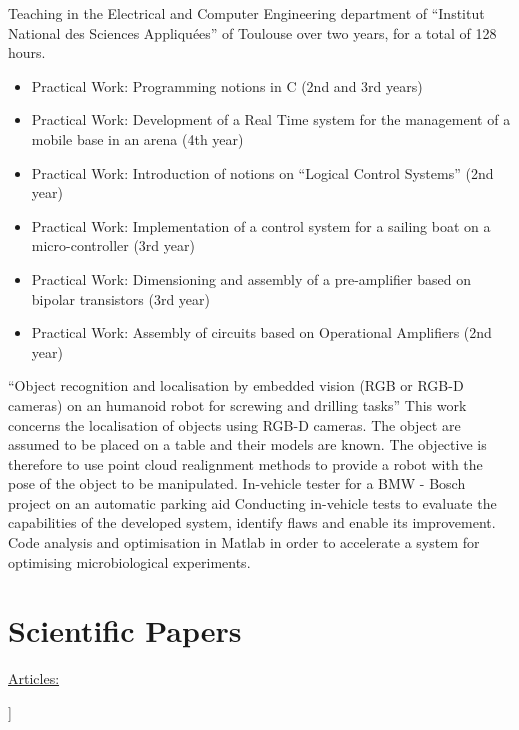 \documentclass[11pt,a4paper,sans]{moderncv}         %
\begin{document}
{}{
  Teaching in the Electrical and Computer Engineering department of ``Institut National des Sciences Appliquées'' of Toulouse over two years, for a total of 128 hours.
  \begin{itemize}
    \item Practical Work: Programming notions in C (2nd and 3rd years)
    \item Practical Work: Development of a Real Time system for the management of a mobile base in an arena (4th year)
    \item Practical Work: Introduction of notions on ``Logical Control Systems'' (2nd year)
    \item Practical Work: Implementation of a control system for a sailing boat on a micro-controller (3rd year)
    \item Practical Work: Dimensioning and assembly of a pre-amplifier based on bipolar transistors (3rd year)
    \item Practical Work: Assembly of circuits based on Operational Amplifiers (2nd year)
  \end{itemize}
}
%
{``Object recognition and localisation by embedded vision (RGB or RGB-D cameras) on an humanoid robot for screwing and drilling tasks''}{
This work concerns the localisation of objects using RGB-D cameras.
The object are assumed to be placed on a table and their models are known.
The objective is therefore to use point cloud realignment methods to provide a robot with the pose of the object to be manipulated.
}
%
{In-vehicle tester for a BMW - Bosch project on an automatic parking aid}{
  Conducting in-vehicle tests to evaluate the capabilities of the developed system, identify flaws and enable its improvement.
}
%
{Code analysis and optimisation in Matlab in order to accelerate a system for optimising microbiological experiments.
}

\section{Scientific Papers}

\toggletrue{myrefs}

\large{\underline{Articles:}}

\begin{itemize}%
\normalsize{\item[[1]\hspace{-2mm}]} \normalsize{}
\end{itemize}
\end{document}
